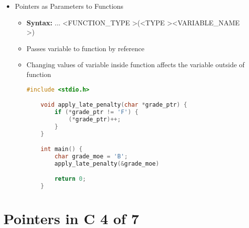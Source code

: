 \documentclass[12pt]{article}
\begin{document}
\bigskip

\begin{itemize}
    \item Pointers as Parameters to Functions
    \begin{itemize}
        \item \textbf{Syntax:} ... \textless FUNCTION\_TYPE \textgreater(\textless TYPE \textgreater *\textless VARIABLE\_NAME \textgreater)
        \item Passes variable to function by reference
        \item Changing values of variable inside function affects the variable
        outside of function

    \begin{lstlisting}[language=c]
    #include <stdio.h>

    void apply_late_penalty(char *grade_ptr) {
        if (*grade_ptr != 'F') {
            (*grade_ptr)++;
        }
    }

    int main() {
        char grade_moe = 'B';
        apply_late_penalty(&grade_moe)

        return 0;
    }
    \end{lstlisting}
    \end{itemize}
\end{itemize}

\bigskip

\section*{Pointers in C 4 of 7}

\bigskip
\end{document}

